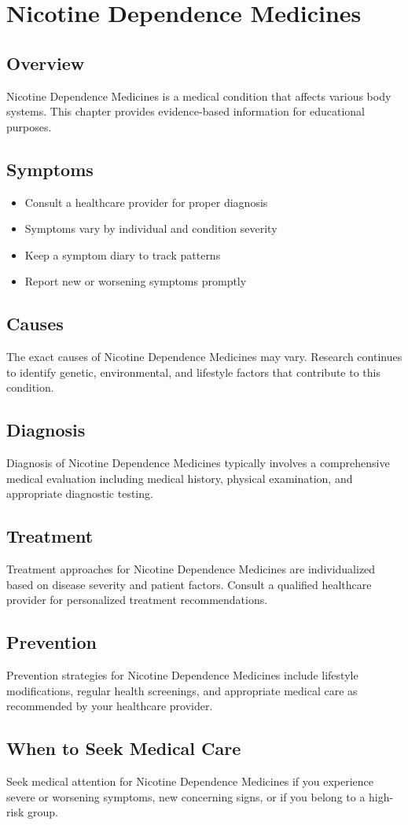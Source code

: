 \chapter{Nicotine Dependence Medicines}

\section*{Overview}
Nicotine Dependence Medicines is a medical condition that affects various body systems. This chapter provides evidence-based information for educational purposes.

\section*{Symptoms}
\begin{itemize}
  \item Consult a healthcare provider for proper diagnosis
  \item Symptoms vary by individual and condition severity
  \item Keep a symptom diary to track patterns
  \item Report new or worsening symptoms promptly
\end{itemize}

\section*{Causes}
The exact causes of Nicotine Dependence Medicines may vary. Research continues to identify genetic, environmental, and lifestyle factors that contribute to this condition.

\section*{Diagnosis}
Diagnosis of Nicotine Dependence Medicines typically involves a comprehensive medical evaluation including medical history, physical examination, and appropriate diagnostic testing.

\section*{Treatment}
Treatment approaches for Nicotine Dependence Medicines are individualized based on disease severity and patient factors. Consult a qualified healthcare provider for personalized treatment recommendations.

\section*{Prevention}
Prevention strategies for Nicotine Dependence Medicines include lifestyle modifications, regular health screenings, and appropriate medical care as recommended by your healthcare provider.

\section*{When to Seek Medical Care}
Seek medical attention for Nicotine Dependence Medicines if you experience severe or worsening symptoms, new concerning signs, or if you belong to a high-risk group.
\clearpage
